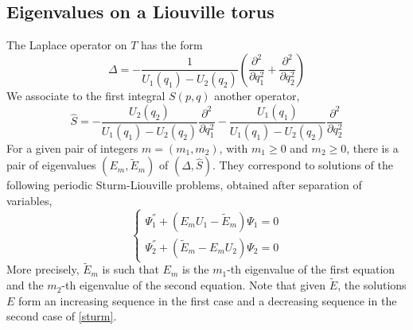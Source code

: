 \documentclass[12pt]{amsart}
\numberwithin{equation}{subsection}
\theoremstyle{definition}
\theoremstyle{plain}
\begin{document}
\subsection{Eigenvalues on a Liouville torus}
\label{section23}
The Laplace operator on $T$ has the form
\[
\Delta = - \frac{1}{U_1(q_1) - U_2(q_2)} \left(\frac{\partial^2}{\partial q_1^2} + \frac{\partial^2}{\partial q_2^2}\right)
\]
We associate to the first integral $S(p,q)$ another operator,
\[
\hat{S} = - \frac{U_2(q_2)}{U_1(q_1) - U_2(q_2)}\frac{\partial^2}{\partial q_1^2} - \frac{U_1(q_1)}{U_1(q_1) - U_2(q_2)}\frac{\partial^2}{\partial q_2^2}
\]
For a given pair of integers $m = (m_1,m_2)$, with $m_1 \geq 0$ and $m_2 \geq 0$,
there is a pair of eigenvalues $(E_{m}, \widetilde{E}_{m})$ of $(\Delta,\hat{S})$.
They correspond to solutions of the following periodic Sturm-Liouville problems, obtained
after separation of variables,
\begin{equation}
\label{sturm}
\begin{cases}
\Psi_1^{''} + (E_m U_1 - \widetilde{E}_m) \Psi_1 = 0 \\
\Psi_2^{''} + (\widetilde{E}_m - E_m U_2) \Psi_2 = 0
\end{cases}
\end{equation}
More precisely, $\widetilde{E}_m$ is such that $E_m$ is the $m_1$-th eigenvalue of the first equation
and the $m_2$-th eigenvalue of the second equation. Note that given $\widetilde{E}$,
the solutions $E$ form an increasing sequence in the first case and a decreasing sequence
in the second case of \eqref{sturm}.
\end{document}
